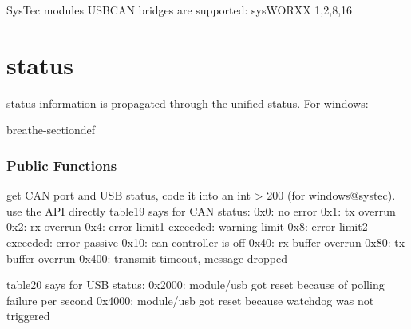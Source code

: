 \documentclass[a4paper,10pt,english]{sphinxmanual}
\begin{document}
\sphinxAtStartPar
SysTec modules USB\sphinxhyphen{}CAN bridges are supported: sysWORXX 1,2,8,16


\section{status}
\label{\detokenize{vendors/systec:status}}
\sphinxAtStartPar
status information is propagated through the unified status.
For windows:

\begin{fulllineitems}
\label{\detokenize{vendors/systec:_CPPv49STCanScan}}%
\pysigstartmultiline
{}%
\pysigstopmultiline
\begin{sphinxuseclass}{breathe-sectiondef}\subsubsection*{Public Functions}

\begin{fulllineitems}
\label{\detokenize{vendors/systec:_CPPv4N9STCanScan13getPortStatusEv}}%
\pysigstartmultiline
{}%
\pysigstopmultiline
\sphinxAtStartPar
get CAN port and USB status, code it into an int \textgreater{} 200 (for windows@systec). use the API directly table19 says for CAN status: 0x0: no error 0x1: tx overrun 0x2: rx overrun 0x4: error limit1 exceeded: warning limit 0x8: error limit2 exceeded: error passive 0x10: can controller is off 0x40: rx buffer overrun 0x80: tx buffer overrun 0x400: transmit timeout, message dropped

\sphinxAtStartPar
table20 says for USB status: 0x2000: module/usb got reset because of polling failure per second 0x4000: module/usb got reset because watchdog was not triggered 

\end{fulllineitems}


\end{sphinxuseclass}
\end{fulllineitems}
\end{document}
